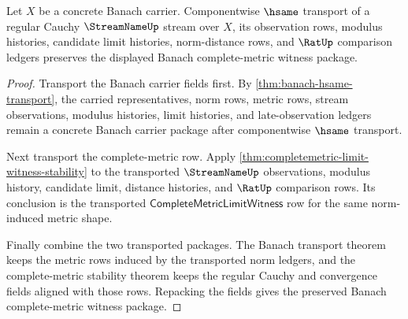 \begin{theorem}
\label{thm:banach-cauchy-stream-transport}
Let $X$ be a concrete Banach carrier. Componentwise $\hsame$ transport of a
regular Cauchy $\StreamNameUp$ stream over $X$, its observation rows, modulus
histories, candidate limit histories, norm-distance rows, and $\RatUp$
comparison ledgers preserves the displayed Banach complete-metric witness
package.
\end{theorem}
\begin{proof}
Transport the Banach carrier fields first. By
\autoref{thm:banach-hsame-transport}, the carried representatives, norm rows,
metric rows, stream observations, modulus histories, limit histories, and
late-observation ledgers remain a concrete Banach carrier package after
componentwise $\hsame$ transport.

Next transport the complete-metric row. Apply
\autoref{thm:completemetric-limit-witness-stability} to the transported
$\StreamNameUp$ observations, modulus history, candidate limit, distance
histories, and $\RatUp$ comparison rows. Its conclusion is the transported
$\mathsf{CompleteMetricLimitWitness}$ row for the same norm-induced metric
shape.

Finally combine the two transported packages. The Banach transport theorem
keeps the metric rows induced by the transported norm ledgers, and the
complete-metric stability theorem keeps the regular Cauchy and convergence
fields aligned with those rows. Repacking the fields gives the preserved
Banach complete-metric witness package.
\end{proof}

